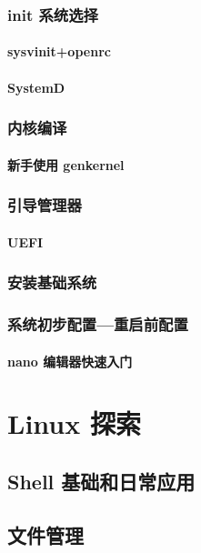\documentclass[amstex]{ctexbook}
\begin{document}
\subsection{init 系统选择}

\subsubsection{sysvinit+openrc}
\subsubsection{SystemD}

\subsection{内核编译}

\subsubsection{新手使用 genkernel}

\subsection{引导管理器}
\subsubsection{UEFI}

\subsection{安装基础系统}
\subsection{系统初步配置—重启前配置}

\subsubsection{nano 编辑器快速入门}

\chapter{Linux 探索}
\section{Shell 基础和日常应用}

\section{文件管理}	
\end{document}
